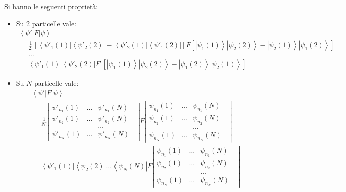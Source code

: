 Si hanno le seguenti proprietà:
\begin{itemize}
\item Su 2 particelle vale:
\begin{equation}\begin{split}
\left\langle \psi '\right |F\left |\psi  \right\rangle=\\
=\frac{1}{2!}\left[\left\langle \psi' _1\left(1\right)\right |\left\langle \psi'_2\left(2\right)\right |-\left\langle \psi'_2\left(1\right)\right |\left\langle \psi'_1\left(2\right)\right |\right]F\left[\left |\psi _1\left(1\right) \right\rangle\left |\psi _2\left(2\right) \right\rangle-\left |\psi _2\left(1\right) \right\rangle\left |\psi _1\left(2\right) \right\rangle\right]=\\
=\dots=\\
=\left\langle \psi' _1\left(1\right)\right |\left\langle \psi'_2\left(2\right)\right |F|\left[\left |\psi _1\left(1\right) \right\rangle\left |\psi _2\left(2\right) \right\rangle-\left |\psi _1\left(2\right) \right\rangle\left |\psi _2\left(1\right) \right\rangle\right]
\end{split}\end{equation}

\item Su $N$ particelle vale:
\begin{equation}\begin{split}
\left\langle \psi '\right |F\left |\psi  \right\rangle=\\
=\frac{1}{N!}\left|\begin{matrix}
\psi' _{n_1}\left(1\right)&\dots&\psi' _{n_1}\left(N\right)\\
\psi' _{n_2}\left(1\right)&\dots&\psi' _{n_2}\left(N\right)\\
&&\dots& \\
\psi' _{n_N}\left(1\right)&\dots&\psi' _{n_N}\left(N\right)
\end{matrix}\right|F\left|\begin{matrix}
\psi _{n_1}\left(1\right)&\dots&\psi _{n_1}\left(N\right)\\
\psi _{n_2}\left(1\right)&\dots&\psi _{n_2}\left(N\right)\\
&&\dots& \\
\psi _{n_N}\left(1\right)&\dots&\psi _{n_N}\left(N\right)
\end{matrix}\right|=\\
=\left\langle \psi '_1\left(1\right)\right |\left\langle\psi _2\left(2\right) \right |\dots\left\langle\psi _N\left(N\right) \right |F\left|\begin{matrix}
\psi _{n_1}\left(1\right)&\dots&\psi _{n_1}\left(N\right)\\
\psi _{n_2}\left(1\right)&\dots&\psi _{n_2}\left(N\right)\\
&&\dots& \\
\psi _{n_N}\left(1\right)&\dots&\psi _{n_N}\left(N\right)
\end{matrix}\right|
\end{split}\end{equation}
\end{itemize}

